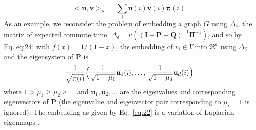\documentclass[10pt,twocolumn]{article}
\numberwithin{equation}{section}
\begin{document}
\begin{equation}
  \label{eq:25}
  <\mathbf{u},\mathbf{v}>_{\bm{\pi}} =
  \sum_{i}{\mathbf{u}(i)\mathbf{v}(i) \bm{\pi}(i)}
\end{equation}
As an example, we reconsider the problem of embedding a graph $G$
using $\Delta_\delta$, the matrix of expected commute time.
$\Delta_\delta = \kappa((\mathbf{I} - \mathbf{P} +
\mathbf{Q})^{-1}\bm{\Pi}^{-1})$, and so by Eq.\eqref{eq:24} with $f(x)
= 1/(1-x)$, the embedding of $v_i \in V$ into $\Re^{d}$ using
$\Delta_\delta$ and the eigensystem of $\mathbf{P}$ is
\begin{equation}
  \label{eq:22}
   \frac{1}{\sqrt{\pi(i)}} \Bigl(\frac{1}{\sqrt{1 - \mu_1}} \mathbf{u}_1(i),
    \dots, \frac{1}{\sqrt{1 - \mu_d}} \mathbf{u}_{d}(i)\Bigr)
\end{equation}
where $1 > \mu_1 \geq \mu_2 \geq \dots$ and $\mathbf{u}_1,
\mathbf{u}_2, \dots$ are the eigenvalues and corresponding
eigenvectors of $\mathbf{P}$ (the eigenvalue and eigenvector pair
corresponding to $\mu_i = 1$ is ignored). The embedding as given by
Eq.~\eqref{eq:22} is a variation of Laplacian eigenmaps
\cite{belkin03:_laplac}.  
%
\end{document}
